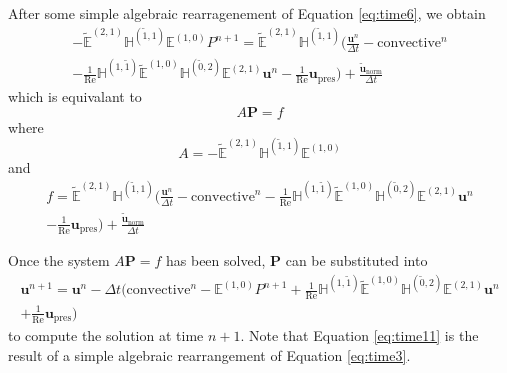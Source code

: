 After some simple algebraic rearragenement of Equation \eqref{eq:time6}, we obtain
\begin{multline}
    \label{eq:time7}
    - \tilde{\mathbb{E}}^{(2,1)} \mathbb{H}^{(\tilde{1},1)} \mathbb{E}^{(1,0)} P^{n+1} = \tilde{\mathbb{E}}^{(2,1)} \mathbb{H}^{(\tilde{1},1)} \biggl( \frac{\mathbf{u}^{n}}{\Delta t} - \text{convective}^{n} \\
    - \frac{1}{\text{Re}} \mathbb{H}^{(1,\tilde{1})} \tilde{\mathbb{E}}^{(1,0)} \mathbb{H}^{(\tilde{0},2)} \mathbb{E}^{(2,1)} \mathbf{u}^{n} - \frac{1}{\text{Re}} \mathbf{u}_{\text{pres}} \biggr) + \frac{\mathbf{\tilde{u}}^{}_{\text{norm}}}{\Delta t}
\end{multline}
which is equivalant to
\begin{equation}
    \label{eq:time8}
    A \mathbf{P} = f
\end{equation}
where
\begin{equation}
    \label{eq:time9}
    A = - \tilde{\mathbb{E}}^{(2,1)} \mathbb{H}^{(\tilde{1},1)} \mathbb{E}^{(1,0)}
\end{equation}
and
\begin{multline}
    \label{eq:time10}
    f = \tilde{\mathbb{E}}^{(2,1)} \mathbb{H}^{(\tilde{1},1)} \biggl( \frac{\mathbf{u}^{n}}{\Delta t} - \text{convective}^{n} - \frac{1}{\text{Re}} \mathbb{H}^{(1,\tilde{1})} \tilde{\mathbb{E}}^{(1,0)} \mathbb{H}^{(\tilde{0},2)} \mathbb{E}^{(2,1)} \mathbf{u}^{n} \\
    - \frac{1}{\text{Re}} \mathbf{u}_{\text{pres}} \biggr) + \frac{\mathbf{\tilde{u}}^{}_{\text{norm}}}{\Delta t}
\end{multline}

Once the system $A \mathbf{P} = f$ has been solved, $\mathbf{P}$ can be substituted into
\begin{multline}
    \label{eq:time11}
    \mathbf{u}^{n+1} = \mathbf{u}^{n} - \Delta t \biggl( \text{convective}^{n} - \mathbb{E}^{(1,0)} P^{n+1} + \frac{1}{\text{Re}} \mathbb{H}^{(1,\tilde{1})} \tilde{\mathbb{E}}^{(1,0)} \mathbb{H}^{(\tilde{0},2)} \mathbb{E}^{(2,1)} \mathbf{u}^{n} \\
    + \frac{1}{\text{Re}} \mathbf{u}_{\text{pres}} \biggr)
\end{multline}
to compute the solution at time $n + 1$. Note that Equation \eqref{eq:time11} is the result of a simple algebraic rearrangement of Equation \eqref{eq:time3}.